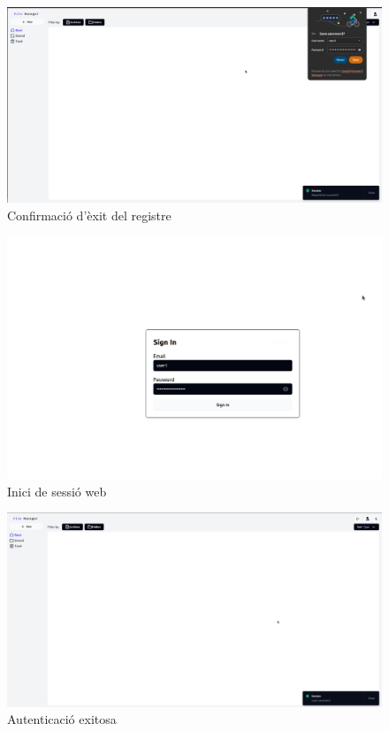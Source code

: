 \begin{figure}[H]
\centering
\includegraphics[width=0.7\linewidth]{Figures/implementacio/signupSuccess.png}
\caption{Confirmació d'èxit del registre}
\label{fig:signupSuccess}
\end{figure}

\begin{figure}[H]
\centering
\includegraphics[width=0.7\linewidth]{Figures/implementacio/login.png}
\caption{Inici de sessió web}
\label{fig:login}
\end{figure}

\begin{figure}[H]
\centering
\includegraphics[width=0.7\linewidth]{Figures/implementacio/loginsuccesfull.png}
\caption{Autenticació exitosa}
\label{fig:loginsuccesfull}
\end{figure}

